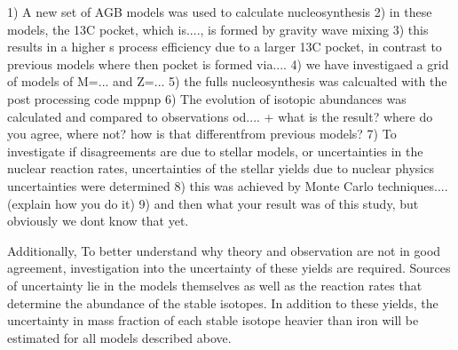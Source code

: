 1) A new set of AGB models was used to calculate nucleosynthesis
2) in these models, the 13C pocket, which is...., is formed by gravity wave mixing
3) this results in a higher s process efficiency due to a larger 13C pocket, in contrast to previous models where then pocket is formed via....
4) we have investigaed a grid of models of M=... and Z=...
5) the fulls nucleosynthesis was calcualted with the  post processing code mppnp
6) The evolution of isotopic abundances was calculated and compared to observations od.... + what is the result? where do you agree, where not? how is that differentfrom previous models?
7) To investigate if disagreements are due to stellar models, or uncertainties in the nuclear reaction rates, uncertainties of the stellar yields due to nuclear physics uncertainties were determined
8) this was achieved by Monte Carlo techniques.... (explain how you do it)
9) and then what your result was of this study, but obviously we dont know that yet. 









Additionally, To better understand why theory and observation are not in good agreement, investigation into the uncertainty of these yields are required. Sources of uncertainty lie in the models themselves as well as the reaction rates that determine the abundance of the stable isotopes. In addition to these yields, the uncertainty in mass fraction of each stable isotope heavier than iron will be estimated for all models described above.